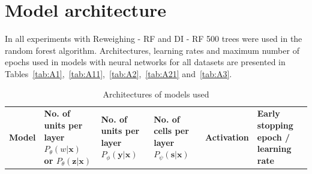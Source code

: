 \documentclass[preprint,12pt]{elsarticle}
\begin{document}
\section{Model architecture}
\label{app:Architecture}

In all experiments with Reweighing - RF and DI - RF 500 trees were used in the random forest algorithm. Architectures, learning rates and maximum number of epochs used in models with neural networks for all datasets are presented in Tables~\ref{tab:A1},~\ref{tab:A11},~\ref{tab:A2},~\ref{tab:A21} and~\ref{tab:A3}.

\begin{table}
	\centering
	\caption{Architectures of models used}
	\label{Table:tab1}
	\begin{adjustbox}{max width=\textwidth, totalheight = \textheight-0.1in}
		\begin{tabular}{|L|L|L|L|L|L|}
			\toprule
			\textbf{Model} & {\textbf{No. of units per layer $P_\theta(w|\mathbf{x})$ or $P_\theta(\mathbf{z}|\mathbf{x})$}} & {\textbf{No. of units per layer $P_\phi(\mathbf{y}|\mathbf{x})$}} & {\textbf{No. of cells per layer $P_\psi(\mathbf{s}|\mathbf{x})$}} & \textbf{Activation} & {\textbf{Early stopping epoch / learning rate}} \\
			

\end{tabular}
\end{adjustbox}
\end{table}
\end{document}
